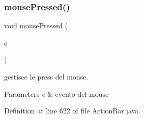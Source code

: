 \subsubsection{\texorpdfstring{mouse\+Pressed()}{mousePressed()}}
{\footnotesize\ttfamily void mouse\+Pressed (\begin{DoxyParamCaption}\item[{Mouse\+Event}]{e }\end{DoxyParamCaption})}



gestisce le press del mouse. 


\begin{DoxyParams}{Parameters}
{\em e} & evento del mouse \\
\hline
\end{DoxyParams}


Definition at line 622 of file Action\+Bar.\+java.

